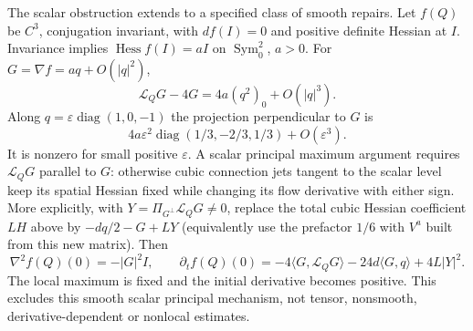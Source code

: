\documentclass[11pt]{article}
\numberwithin{equation}{section}
\theoremstyle{definition}
\theoremstyle{remark}
\DeclareMathOperator{\Sym}{Sym}
\begin{document}
The scalar obstruction extends to a specified class of smooth repairs.
Let $f(Q)$ be $C^3$, conjugation invariant, with $df(I)=0$ and positive
definite Hessian at $I$. Invariance implies
$\operatorname{Hess}f(I)=aI$ on $\Sym^2_0$, $a>0$. For
$G=\nabla f=a q+O(|q|^2)$,
\[
 \mathscr L_QG-4G=4a(q^2)_0+O(|q|^3).
\]
Along $q=\varepsilon\operatorname{diag}(1,0,-1)$ the projection perpendicular
to $G$ is
\[
 4a\varepsilon^2\operatorname{diag}(1/3,-2/3,1/3)+O(\varepsilon^3).
\]
It is nonzero for small positive $\varepsilon$. A scalar principal
maximum argument requires $\mathscr L_QG$ parallel to $G$: otherwise
cubic connection jets tangent to the scalar level keep its spatial
Hessian fixed while changing its flow derivative with either sign.
More explicitly, with $Y=\Pi_{G^\perp}\mathscr L_QG\ne0$, replace the
total cubic Hessian coefficient $LH$ above by $-dq/2-G+LY$
(equivalently use the prefactor $1/6$ with $V^a$ built from this
new matrix). Then
\[
 \nabla^2f(Q)(0)=-|G|^2I,\qquad
 \partial_tf(Q)(0)=-4\langle G,\mathscr L_QG\rangle
                    -24d\langle G,q\rangle+4L|Y|^2.
\]
The local maximum is fixed and the initial derivative becomes positive.
This excludes this smooth scalar principal mechanism, not tensor,
nonsmooth, derivative-dependent or nonlocal estimates.
\end{document}
